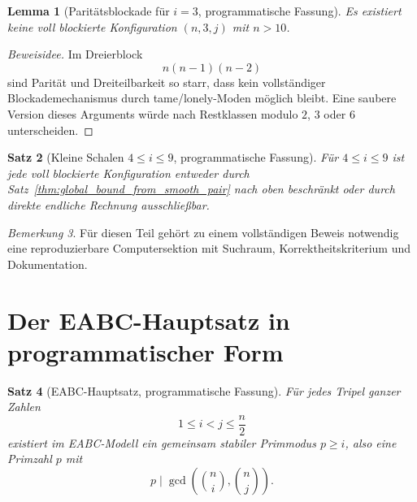 \documentclass[12pt,a4paper]{article}
\theoremstyle{plain}
\newtheorem{theorem}{Satz}[section]
\newtheorem{lemma}[theorem]{Lemma}
\theoremstyle{definition}
\theoremstyle{remark}
\newtheorem{remark}[theorem]{Bemerkung}
\begin{document}
	\begin{lemma}[Paritätsblockade für \(i=3\), programmatische Fassung]
		\label{lem:i3}
		Es existiert keine voll blockierte Konfiguration \((n,3,j)\) mit \(n>10\).
	\end{lemma}
	
	\begin{proof}[Beweisidee]
		Im Dreierblock
		\[
		n(n-1)(n-2)
		\]
		sind Parität und Dreiteilbarkeit so starr, dass kein vollständiger Blockademechanismus durch tame/lonely-Moden möglich bleibt. Eine saubere Version dieses Arguments würde nach Restklassen modulo \(2\), \(3\) oder \(6\) unterscheiden.
	\end{proof}
	
	\begin{theorem}[Kleine Schalen \(4\le i\le 9\), programmatische Fassung]
		Für \(4\le i\le9\) ist jede voll blockierte Konfiguration entweder durch Satz~\ref{thm:global_bound_from_smooth_pair} nach oben beschränkt oder durch direkte endliche Rechnung ausschließbar.
	\end{theorem}
	
	\begin{remark}
		Für diesen Teil gehört zu einem vollständigen Beweis notwendig eine reproduzierbare Computersektion mit Suchraum, Korrektheitskriterium und Dokumentation.
	\end{remark}
	
	\section{Der EABC-Hauptsatz in programmatischer Form}
	
	\begin{theorem}[EABC-Hauptsatz, programmatische Fassung]
		\label{thm:eabc-hauptsatz}
		Für jedes Tripel ganzer Zahlen
		\[
		1\le i<j\le \frac{n}{2}
		\]
		existiert im EABC-Modell ein gemeinsam stabiler Primmodus \(p\ge i\), also eine Primzahl \(p\) mit
		\[
		p\mid \gcd\!\left(\binom{n}{i},\binom{n}{j}\right).
		\]
	\end{theorem}
	
\end{document}
